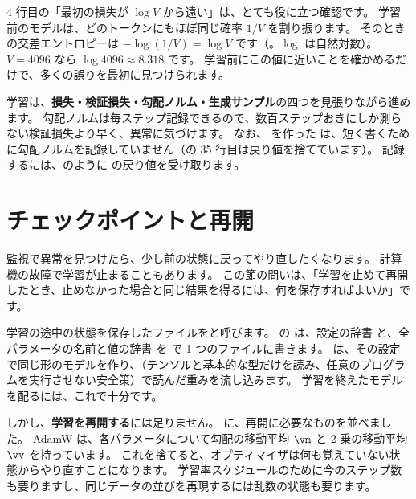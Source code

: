 4 行目の「最初の損失が $\log V$ から遠い」は、とても役に立つ確認です。
学習前のモデルは、どのトークンにもほぼ同じ確率 $1/V$ を割り振ります。
そのときの交差エントロピーは $-\log(1/V)=\log V$ です（。$\log$ は自然対数）。
$V=4096$ なら $\log 4096 \approx 8.318$ です。
学習前にこの値に近いことを確かめるだけで、多くの誤りを最初に見つけられます。

学習は、\textbf{損失・検証損失・勾配ノルム・生成サンプル}の四つを見張りながら進めます。
勾配ノルムは毎ステップ記録できるので、数百ステップおきにしか測らない検証損失より早く、異常に気づけます。
なお、 を作った  は、短く書くために勾配ノルムを記録していません（の 35 行目は戻り値を捨てています）。
記録するには、のように  の戻り値を受け取ります。

\section{チェックポイントと再開}\label{sec:pt-ckpt}

監視で異常を見つけたら、少し前の状態に戻ってやり直したくなります。
計算機の故障で学習が止まることもあります。
この節の問いは、「学習を止めて再開したとき、止めなかった場合と同じ結果を得るには、何を保存すればよいか」です。

学習の途中の状態を保存したファイルをと呼びます。
 の  は、設定の辞書  と、全パラメータの名前と値の辞書  を  で 1 つのファイルに書きます。
 は、その設定で同じ形のモデルを作り、（テンソルと基本的な型だけを読み、任意のプログラムを実行させない安全策）で読んだ重みを流し込みます。
学習を終えたモデルを配るには、これで十分です。

しかし、\textbf{学習を再開する}には足りません。
に、再開に必要なものを並べました。
AdamW は、各パラメータについて勾配の移動平均 $\vm$ と 2 乗の移動平均 $\vv$ を持っています。
これを捨てると、オプティマイザは何も覚えていない状態からやり直すことになります。
学習率スケジュールのために今のステップ数も要りますし、同じデータの並びを再現するには乱数の状態も要ります。


